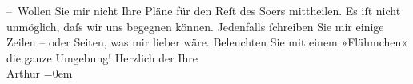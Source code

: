 \begin{ledgroupsized}[t]{13cm}
           \pstart
           – Wollen Sie mir nicht Ihre Pläne für den Reſt des So{\geminationm}ers mittheilen. Es iſt nicht unmöglich, daſs wir uns begegnen können.
                    Jedenfalls ſchreiben Sie mir einige Zeilen – oder Seiten, was mir lieber wäre.
                    Beleuchten {\pb}Sie mit einem »Flähmchen« die ganze
                    Umgebung!\pend
           \pstart
           Herzlich der Ihre{\\[\baselineskip]}\spacefill\mbox{Arthur}\pend
           \leftskip=0em{}\endnumbering{}\end{ledgroupsized}  \newcommand{\dateiname}{L00248}\newcommand{\titel}{Arthur Schnitzler an Hugo von Hofmannsthal, 2. 8. 1893}\newcommand{\editorInnen}{ Martin Anton Müller und Gerd-Hermann Susen}
      